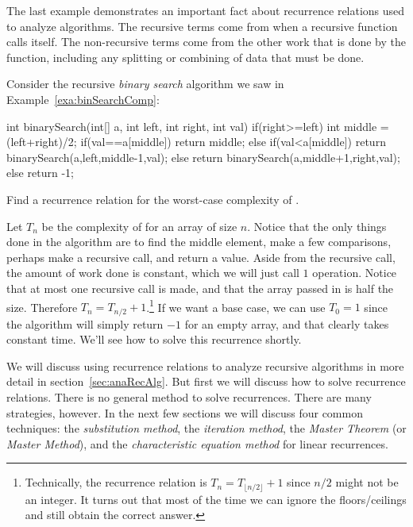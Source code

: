 The last example demonstrates an important fact about recurrence relations used to analyze algorithms.
The recursive terms come from when a recursive function calls itself.  
The non-recursive terms come from the other work that is done by the function,
including any splitting or combining of data that must be done.

\newpage

\begin{exa}\label{exa:binSearchRecRel}
Consider the recursive {\em binary search} algorithm we saw in Example~\ref{exa:binSearchComp}:
\begin{code}
    int binarySearch(int[] a, int left, int right, int val) {
        if(right>=left) {
            int middle = (left+right)/2;
            if(val==a[middle])      
                return middle;
            else if(val<a[middle])  
                return binarySearch(a,left,middle-1,val);
            else                   
                return binarySearch(a,middle+1,right,val);
        } else {
            return -1;
        }
    }
\end{code}
Find a recurrence relation for the worst-case complexity of .
\begin{sol}
Let $T_n$ be the complexity of  for an array of size $n$.
Notice that the only things done in the algorithm are to find the middle element,
make a few comparisons, perhaps make a recursive call, and return a value.  Aside from
the recursive call, the amount of work done is constant, which we will just call $1$ operation.  
Notice that at most one recursive call is made, and that the array passed in is half
the size.
Therefore  $T_n=T_{n/2}+1$.\footnote{Technically, 
the recurrence relation is  $T_n=T_{\lfloor n/2\rfloor}+1$ since $n/2$ might not be an integer. 
It turns out that most of the time we can ignore the floors/ceilings and still obtain the correct answer.
}
If we want a base case, we can use $T_0=1$ since the algorithm will simply return $-1$ for an
empty array, and that clearly takes constant time.
We'll see how to solve this recurrence shortly.
\end{sol}
\end{exa}

We will discuss using recurrence relations to analyze recursive algorithms in more detail
in section~\ref{sec:anaRecAlg}.  But first we will discuss how to solve recurrence relations.
There is no general method to solve recurrences.
There are many strategies, however.  In the next few sections we will discuss
four common techniques: 
the {\em substitution method},  
the {\em iteration method},
the {\em Master Theorem} (or {\em Master Method}),
and the {\em characteristic equation method} for linear recurrences.

